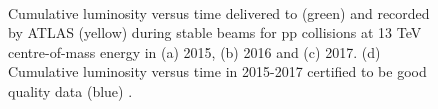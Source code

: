 \begin{figure}[ht]
\centering
{}
\\
\caption{Cumulative luminosity versus time delivered to (green) and recorded by ATLAS (yellow) during stable beams for pp collisions at 13 TeV centre-of-mass energy in (a) 2015, (b) 2016 and (c) 2017. (d) Cumulative luminosity versus time in 2015-2017 certified to be good quality data (blue) \cite{LumiTwiki}.}
\label{fig:atlas:lumi1}
\end{figure}

